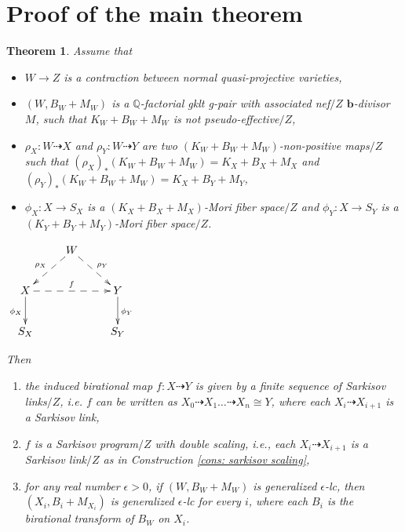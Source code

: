 \documentclass[11pt]{amsart}
\numberwithin{equation}{section}
\newcommand{\bb}{\bm{b}}
\newtheorem{thm}{Theorem}[section]
\theoremstyle{definition}
\theoremstyle{remark}
\theoremstyle{definition}
\begin{document}
\section{Proof of the main theorem}
\begin{thm}\label{thm: existence sarkisov precise}
Assume that 
\begin{itemize}
    \item $W\rightarrow Z$ is a contraction between normal quasi-projective varieties,
    \item $(W,B_W+M_W)$ is a $\mathbb Q$-factorial gklt g-pair with associated nef$/Z$ $\bb$-divisor $M$, such that $K_W+B_W+M_W$ is not pseudo-effective$/Z$,
    \item $\rho_X: W\dashrightarrow X$ and $\rho_Y: W\dashrightarrow Y$ are two $(K_W+B_W+M_W)$-non-positive maps$/Z$ such that $(\rho_X)_*(K_W+B_W+M_W)=K_X+B_X+M_X$ and $(\rho_Y)_*(K_W+B_W+M_W)=K_X+B_Y+M_Y$,
    \item $\phi_X: X\rightarrow S_X$ is a $(K_X+B_X+M_X)$-Mori fiber space$/Z$ and $\phi_Y: X\rightarrow S_Y$ is a $(K_Y+B_Y+M_Y)$-Mori fiber space$/Z$.
\end{itemize}
\begin{center}$\xymatrix{
 & W\ar@{-->}[dl]_{\rho_X}\ar@{-->}[dr]^{\rho_Y}& \\
      X \ar@{->}[d]_{\phi_X}\ar@{-->}[rr]^{f}   &  & Y\ar@{->}[d]^{\phi_Y} \\
    S_X & &S_Y }$
\end{center}
Then
\begin{enumerate}
    \item the induced birational map $f: X\dashrightarrow Y$ is given by a finite sequence of Sarkisov links$/Z$, i.e. $f$ can be written as $X_0\dashrightarrow X_1\dots\dashrightarrow X_n\cong Y$, where each $X_{i}\dashrightarrow X_{i+1}$ is a Sarkisov link,
    \item $f$ is a Sarkisov program$/Z$ with double scaling, i.e., each $X_{i}\dashrightarrow X_{i+1}$ is a Sarkisov link$/Z$ as in Construction \ref{cons: sarkisov scaling},
    \item for any real number $\epsilon>0$, if $(W,B_W+M_W)$ is generalized $\epsilon$-lc, then $(X_i,B_i+M_{X_i})$ is generalized $\epsilon$-lc for every $i$, where each $B_i$ is the birational transform of $B_W$ on $X_i$.
\end{enumerate} 
\end{thm}
\end{document}
